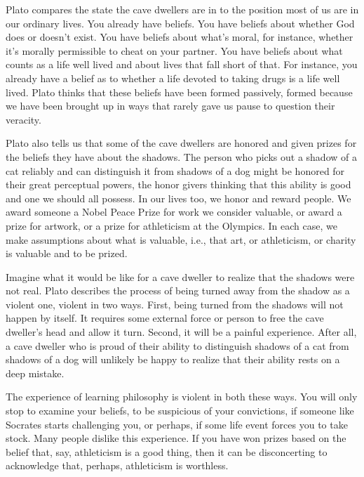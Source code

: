 \documentclass[]{article}
\begin{document}
Plato compares the state the cave dwellers are in to the position most
of us are in our ordinary lives. You already have beliefs. You have
beliefs about whether God does or doesn't exist. You have beliefs about
what's moral, for instance, whether it's morally permissible to cheat on
your partner. You have beliefs about what counts as a life well lived
and about lives that fall short of that. For instance, you already have
a belief as to whether a life devoted to taking drugs is a life well
lived. Plato thinks that these beliefs have been formed passively,
formed because we have been brought up in ways that rarely gave us pause
to question their veracity.

Plato also tells us that some of the cave dwellers are honored and given
prizes for the beliefs they have about the shadows. The person who picks
out a shadow of a cat reliably and can distinguish it from shadows of a
dog might be honored for their great perceptual powers, the honor givers
thinking that this ability is good and one we should all possess. In our
lives too, we honor and reward people. We award someone a Nobel Peace
Prize for work we consider valuable, or award a prize for artwork, or a
prize for athleticism at the Olympics. In each case, we make assumptions
about what is valuable, i.e., that art, or athleticism, or charity is
valuable and to be prized.

Imagine what it would be like for a cave dweller to realize that the
shadows were not real. Plato describes the process of being turned away
from the shadow as a violent one, violent in two ways. First, being
turned from the shadows will not happen by itself. It requires some
external force or person to free the cave dweller's head and allow it
turn. Second, it will be a painful experience. After all, a cave dweller
who is proud of their ability to distinguish shadows of a cat from
shadows of a dog will unlikely be happy to realize that their ability
rests on a deep mistake.

The experience of learning philosophy is violent in both these ways. You
will only stop to examine your beliefs, to be suspicious of your
convictions, if someone like Socrates starts challenging you, or
perhaps, if some life event forces you to take stock. Many people
dislike this experience. If you have won prizes based on the belief
that, say, athleticism is a good thing, then it can be disconcerting to
acknowledge that, perhaps, athleticism is worthless.
\end{document}
